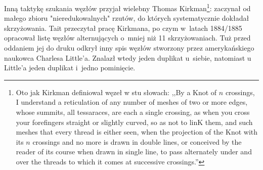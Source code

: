 \begin{comment}
\[
\begin{tikzpicture}[baseline=-0.65ex, scale=0.1]
\begin{knot}[clip width=5, end tolerance=1pt, flip crossing/.list={1}]
    \strand[thick] (-21, -5) [in=180, out=0] to (-7, 5);
    \strand[thick] (-21, 5) [in=180, out=0] to (-7, -5);
    \draw (-7, -7) rectangle (7, 7);
    \node at (0, 0) {\Huge {$T$}};
    \draw[thick] (7, -5) to (21, -5);
    \draw[thick] (7, 5) to (21, 5);
\end{knot}
\end{tikzpicture}
\quad \cong_{\mathrm{flype}} \quad
\begin{tikzpicture}[baseline=-0.65ex, scale=0.1]
\begin{knot}[clip width=5, end tolerance=1pt]
    \strand[thick] (21, -5) [in=0, out=180] to (7, 5);
    \strand[thick] (21, 5) [in=0, out=180] to (7, -5);
    \draw (-7, -7) rectangle (7, 7);
    \node at (0, 0) {\rotatebox[origin=c]{-180}{\Huge $T$}};
    \draw[thick] (-7, -5) to (-21, -5);
    \draw[thick] (-7, 5) to (-21, 5);
\end{knot}
\end{tikzpicture}
\]
\end{comment}

Inną taktykę szukania węzłów przyjał wielebny Thomas Kirkman\footnote{Oto jak Kirkman definiował węzeł w stu słowach: ,,By a Knot of $n$ crossings, I understand a reticulation of any number of meshes of two or more edges, whose summits, all tessaraces, are each a single crossing, as when you cross your forefingers straight or slightly curved, so as not to linK them, and such meshes that every thread is either seen, when the projection of the Knot with its $n$ crossings and no more is drawn in double lines, or conceived by the reader of its course when drawn in single line, to pass alternately under and over the threads to which it comes at successive crossings.''}: zaczynał od małego zbioru "nieredukowalnych" rzutów, do których systematycznie dokładał skrzyżowania.
Tait przeczytał pracę Kirkmana, po czym w~latach 1884/1885 opracował listę węzłów alternujących o~mniej niż 11 skrzyżowaniach.
Tuż przed oddaniem jej do druku odkrył inny spis węzłów stworzony przez amerykańskiego naukowca Charlesa Little'a.
Znalazł wtedy jeden duplikat u~siebie, natomiast u Little'a jeden duplikat i~jedno pominięcie.

